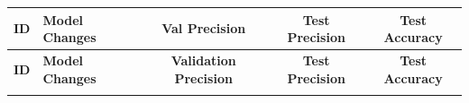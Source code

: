 \documentclass[a4paper,12pt]{article}
\begin{document}
\begin{landscape}
	\thispagestyle{empty}  %
	
	\vspace*{-1.5cm}
	
	
	\begin{adjustwidth}{0cm}{-3cm}

	\begin{longtable}{|c|p{12cm}|c|c|c|}	
		
		\hline
		\textbf{ID} & \textbf{Model Changes} & \textbf{Val Precision} & \textbf{Test Precision} & \textbf{Test Accuracy} \\
		\hline
		\endfirsthead
		\hline
		\textbf{ID} & \textbf{Model Changes} & \textbf{Validation Precision} & \textbf{Test Precision} & \textbf{Test Accuracy} \\
		\hline
		\endhead
		\hline
		\endfoot
		\hline
		

\end{longtable}
\end{adjustwidth}
\end{landscape}
\end{document}
